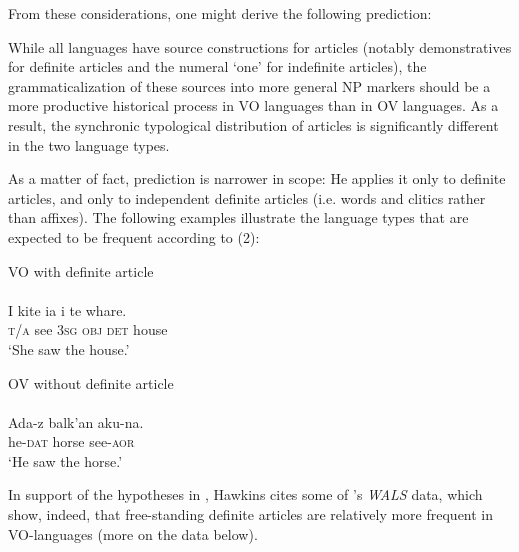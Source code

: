 \documentclass[output=paper]{langsci/langscibook}
\begin{document}
From these considerations, one might derive the following prediction:

\ea
{While all languages have source constructions for articles (notably demonstratives for definite articles and the numeral ‘one’ for indefinite articles), the grammaticalization of these sources into more general NP markers should be a more productive historical process in VO languages than in OV languages. As a result, the synchronic typological distribution of articles is significantly different in the two language types.}\\
\z


As a matter of fact,  prediction is narrower in scope: He applies it only to definite articles, and only to independent definite articles (i.e. words and clitics rather than affixes). The following examples illustrate the language types that are expected to be frequent according to (2):

\ea\label{ex:ksb:2}
\ea  VO with definite article\\
\\
\gll I kite ia i te whare.\\
     \textsc{t/a}   see \textsc{3sg}   \textsc{obj}   \textsc{det}   house\\
\glt ‘She saw the house.’

\ex
 OV without definite article\\ 
\\
\gll Ada-z  balk’an   aku-na.\\
     he-\textsc{dat}   horse     see-\textsc{aor}\\
\glt ‘He saw the horse.’
\z
\z

In support of the hypotheses in , Hawkins cites some of 's \textit{WALS} data, which show, indeed, that free-standing definite articles are relatively more frequent in VO-languages (more on the data below).
\end{document}
